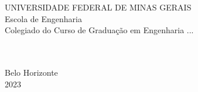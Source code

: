 
\begin{titlepage}

    \begin{center}
        \begin{spacing}{1}
            UNIVERSIDADE FEDERAL DE MINAS GERAIS \\
            Escola de Engenharia \\
            Colegiado do Curso de Graduação em Engenharia ... \\ %
        \end{spacing}
        \vspace{5cm}
        \theauthor \\
        \vspace{5cm}
        \textbf{\MakeUppercase\thetitle}\\ %
        \vspace*{\fill}
        Belo Horizonte\\2023
    \end{center}

\end{titlepage}